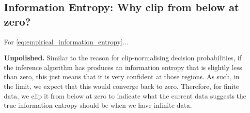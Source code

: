 \documentclass{article}
\newcommand{\note}[1]{{\color{orange} #1}}
\begin{document}
	\subsection{Information Entropy: Why clip from below at zero?}
	
		For \eqref{eq:empirical_information_entropy}...
		
		\note{\textbf{Unpolished.}} Similar to the reason for clip-normalising decision probabilities, if the inference algorithm has produces an information entropy that is slightly less than zero, this just means that it is very confident at those regions. As such, in the limit, we expect that this would converge back to zero. Therefore, for finite data, we clip it from below at zero to indicate what the current data suggests the true information entropy should be when we have infinite data.
		
\end{document}

